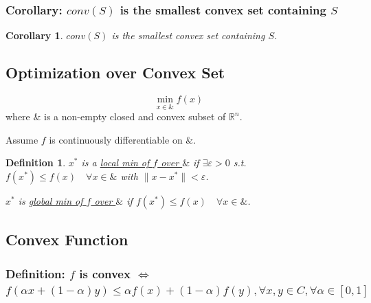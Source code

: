 \documentclass[11pt,a4paper]{article}
\newtheorem{corollary}{Corollary}
\newtheorem{definition}{Definition}
\begin{document}
\subsubsection{Corollary: $conv(S)$ is the smallest convex set containing $S$}
\begin{corollary}
    $conv(S)$ is the smallest convex set containing $S$.
\end{corollary}

\subsection{Optimization over Convex Set}
$$\min_{x\in \&} f(x)$$
where $\&$ is a non-empty closed and convex subset of $\mathbb{R}^n$.

Assume $f$ is continuously differentiable on $\&$.

\begin{definition}
$x^*$ is a \underline{local min of $f$ over $\&$} if $\exists \varepsilon>0$ s.t. $f(x^*)\leq f(x)\quad \forall x\in \&$ with $\|x-x^*\|<\varepsilon$.

$x^*$ is \underline{global min of $f$ over $\&$} if $f(x^*)\leq f(x)\quad \forall x\in \&$.
\end{definition}


\subsection{Convex Function}
\subsubsection{Definition: $f$ is convex $\Leftrightarrow$ $f(\alpha x+(1-\alpha) y) \leq \alpha f(x)+(1-\alpha) f(y), \forall x, y \in C, \forall \alpha \in[0,1]$}
\begin{center}
\end{center}
\end{document}
